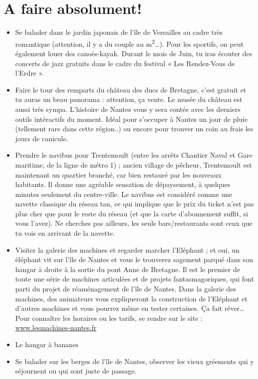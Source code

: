 \section{A faire absolument!}\trad
\begin{itemize}
  \item Se balader dans le jardin japonais de l'île de Versailles au cadre très romantique (attention, il y a du couple au m\textsuperscript{2}\dots).
Pour les sportifs, on peut également louer des canoës-kayak.
Durant le mois de Juin, tu iras écouter des concerts de jazz gratuits dans le cadre du festival « Les Rendez-Vous de l'Erdre ».
  \item Faire le tour des remparts du château des ducs de Bretagne, c'est gratuit et tu auras un beau panorama : attention, ça vente.
Le musée du château est aussi très sympa.
L'histoire de Nantes vous y sera contée avec les derniers outils intéractifs du moment.
Idéal pour s'occuper à Nantes un jour de pluie (tellement rare dans cette région..) ou encore pour trouver un coin au frais les jours de canicule.
  \item Prendre le navibus pour Trentemoult (entre les arrêts Chantier Naval et Gare maritime, de la ligne de métro 1) ; ancien village de pêcheur, Trentemoult est maintenant un quartier branché, car bien restauré par les nouveaux habitants.
Il donne une agréable sensation de dépaysement, à quelques minutes seulement du centre-ville.
Le navibus est considéré comme une navette classique du réseau tan, ce qui implique que le prix du ticket n'est pas plus cher que pour le reste du réseau (et que la carte d'abonnement suffit, si vous l'avez).
Ne cherches pas ailleurs, les seuls bars/restaurants sont ceux que tu vois en arrivant de la navette.
  \item Visiter la galerie des machines et regarder marcher l'Eléphant ; et oui, un éléphant vit sur l'île de Nantes et vous le trouverez sagement parqué dans son hangar à droite à la sortie du pont Anne de Bretagne.
Il est le premier de toute une série de machines articulées et de projets fantasmagoriques, qui font parti du projet de réaménagement de l'île de Nantes.
Dans la galerie des machines, des animateurs vous expliqueront la construction de l'Eléphant et d'autres machines et vous pourrez même en tester certaines.
Ça fait rêver\dots Pour connaître les horaires ou les tarifs, se rendre sur le site : \url{www.lesmachines-nantes.fr}
  \item Le hangar à bananes
  \item Se balader sur les berges de l'île de Nantes, observer les vieux gréements qui y séjournent ou qui sont juste de passage.
\end{itemize}

